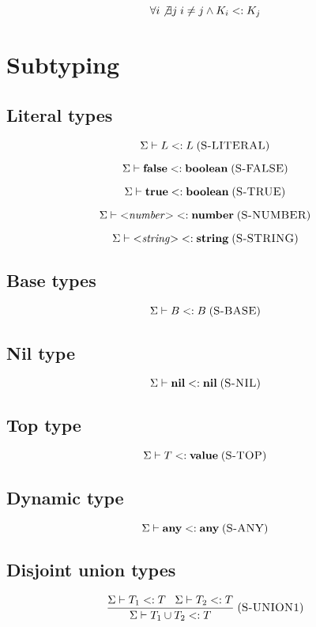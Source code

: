 \documentclass[12pt]{article}
\newcommand{\Top}{\mathbf{value}}
\newcommand{\Any}{\mathbf{any}}
\newcommand{\Nil}{\mathbf{nil}}
\newcommand{\False}{\mathbf{false}}
\newcommand{\True}{\mathbf{true}}
\newcommand{\Boolean}{\mathbf{boolean}}
\newcommand{\Number}{\mathbf{number}}
\newcommand{\String}{\mathbf{string}}
\newcommand{\mylabel}[1]{\; (\textsc{#1})}
\newcommand{\subtype}{<:}
\newcommand{\senv}{\Sigma}
\begin{document}
\[
\forall i \not\exists j \; i \not= j \wedge K_{i} \subtype K_{j}
\]

\section{Subtyping}

\subsection{Literal types}

\[
\senv \vdash L \subtype L
\mylabel{S-LITERAL}
\]

\[
\senv \vdash \False \subtype \Boolean
\mylabel{S-FALSE}
\]

\[
\senv \vdash \True \subtype \Boolean
\mylabel{S-TRUE}
\]

\[
\senv \vdash {<}{\it number}{>} \subtype \Number
\mylabel{S-NUMBER}
\]

\[
\senv \vdash {<}{\it string}{>} \subtype \String
\mylabel{S-STRING}
\]

\subsection{Base types}

\[
\senv \vdash B \subtype B
\mylabel{S-BASE}
\]

\subsection{Nil type}

\[
\senv \vdash \Nil \subtype \Nil
\mylabel{S-NIL}
\]

\subsection{Top type}

\[
\senv \vdash T \subtype \Top
\mylabel{S-TOP}
\]

\subsection{Dynamic type}

\[
\senv \vdash \Any \subtype \Any
\mylabel{S-ANY}
\]

\subsection{Disjoint union types}

\[
\frac{\senv \vdash T_{1} \subtype T \;\;\;
      \senv \vdash T_{2} \subtype T}
     {\senv \vdash T_{1} \cup T_{2} \subtype T}
\mylabel{S-UNION1}
\]
\end{document}
